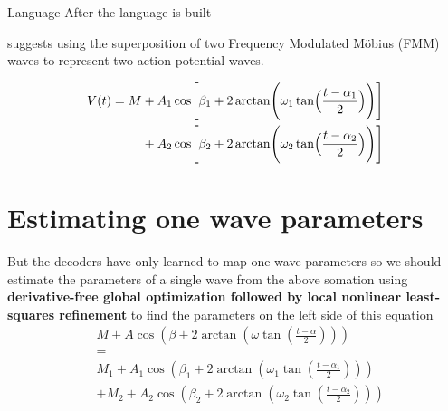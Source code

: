 \begin{frame}{Language}
    After the language is built
    
    \cite{rueda-2021-a-novel-wave-decomposition-for-oscillatory-signals} suggests using the superposition of two Frequency Modulated M\"obius (FMM) waves to represent two action potential waves.
    
    \begin{equation}
        \begin{aligned}
            V(t)
            =
            M
            &+
            A_1
            \cos
            \Biggl[
                \beta_1
                +
                2
                \arctan
                \Biggl(
                \omega_1
                \tan
                \Bigl(
                \frac{t-\alpha_1}{2}
                \Bigr)
                \Biggr)
                \Biggr]
            \\
            &+
            A_2
            \cos
            \Biggl[
                \beta_2
                +
                2
                \arctan
                \Biggl(
                \omega_2
                \tan
                \Bigl(
                \frac{t-\alpha_2}{2}
                \Bigr)
                \Biggr)
                \Biggr]
        \end{aligned}
    \end{equation}
    
    
    \section{Estimating one wave parameters}
        But the decoders have only learned to map one wave parameters so we should estimate the parameters of a single wave from the above somation using \textbf{derivative-free global optimization followed by local nonlinear least-squares refinement} to find the parameters on the left side of this equation
        \[
            \begin{aligned}
                &M
                +
                A\cos\left(
                         \beta
                         +
                         2\arctan\left(
                                     \omega\tan\left(\frac{t-\alpha}{2}\right)
                    \right)
                \right)
                \\
                &=
                \\
                &M_1
                +
                A_1\cos\left(
                           \beta_1
                    +
                    2\arctan\left(
                                \omega_1\tan\left(\frac{t-\alpha_1}{2}\right)
                    \right)
                \right)
                \\
                &+
                M_2
                +
                A_2\cos\left(
                           \beta_2
                    +
                    2\arctan\left(
                                \omega_2\tan\left(\frac{t-\alpha_2}{2}\right)
                    \right)
                \right)
            \end{aligned}
        \]
\end{frame}